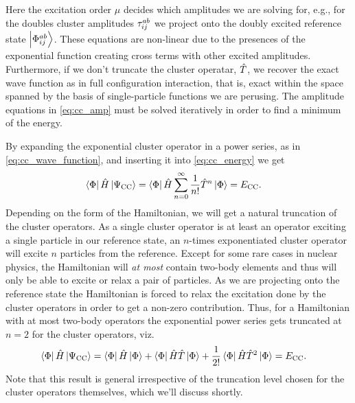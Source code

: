         Here the excitation order $\mu$ decides which amplitudes we are solving
        for, e.g., for the doubles cluster amplitudes $\tau^{ab}_{ij}$ we
        project onto the doubly excited reference state $\ket{\Phi^{ab}_{ij}}$.
        These equations are non-linear due to the presences of the exponential
        function creating cross terms with other excited amplitudes.
        Furthermore, if we don't truncate the cluster operatar, $\hat{T}$, we
        recover the exact wave function as in full configuration interaction,
        that is, exact within the space spanned by the basis of single-particle
        functions we are perusing.
        The amplitude equations in \autoref{eq:cc_amp} must be solved
        iteratively in order to find a minimum of the energy.

        By expanding the exponential cluster operator in a power series, as in
        \autoref{eq:cc_wave_function}, and inserting it into
        \autoref{eq:cc_energy} we get
        \begin{align}
            \bra{\Phi}\hat{H} \ket{\Psi_{\text{CC}}}
            &=
            \bra{\Phi}\hat{H}
            \sum_{n = 0}^{\infty} \frac{1}{n!}\hat{T}^n
            \ket{\Phi}
            = E_{\text{CC}}.
        \end{align}
        Depending on the form of the Hamiltonian, we will get a natural
        truncation of the cluster operators.
        As a single cluster operator is at
        least an operator exciting a single particle in our reference state, an
        $n$-times exponentiated cluster operator will excite $n$ particles from
        the reference.
        Except for some rare cases in nuclear physics,
        the Hamiltonian will \emph{at most} contain two-body elements and thus
        will only be able to excite or relax a pair of particles.
        As we are projecting onto the reference state the Hamiltonian is forced
        to relax the excitation done by the cluster operators in order to get a
        non-zero contribution.
        Thus, for a Hamiltonian with at most two-body operators the exponential
        power series gets truncated at $n = 2$ for the cluster operators, viz.
        \begin{align}
            \bra{\Phi}\hat{H} \ket{\Psi_{\text{CC}}}
            &=
            \bra{\Phi}\hat{H}\ket{\Phi}
            + \bra{\Phi}\hat{H} \hat{T} \ket{\Phi}
            + \frac{1}{2!}
            \bra{\Phi} \hat{H} \hat{T}^2 \ket{\Phi}
            = E_{\text{CC}}.
        \end{align}
        Note that this result is general irrespective of the truncation level
        chosen for the cluster operators themselves, which we'll discuss
        shortly.

